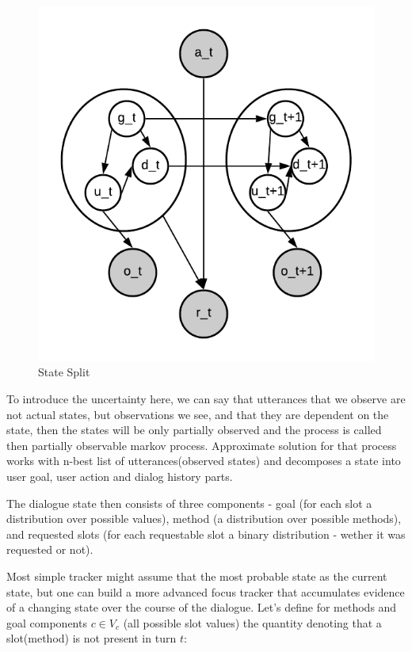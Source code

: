 \documentclass[12pt,titlepage,a4paper]{article}
\begin{document}
\begin{figure}[!htb]
      \includegraphics[width=\linewidth]{state-split.png}
      \caption{State Split}
    \endminipage\hfill
\end{figure}

To introduce the uncertainty here, we can say that utterances that we observe are not actual states, but observations we see, and that they are dependent on the state, then the states will be only partially observed and the process is called then partially observable markov process. Approximate solution for that process works with n-best list of utterances(observed states) and decomposes a state into user goal, user action and dialog history parts.

The dialogue state then consists of three components - goal (for each slot a distribution over possible values), method (a distribution over possible methods), and requested slots (for each requestable slot a binary distribution - wether it was requested or not).
\par
Most simple tracker might assume that the most probable state as the current state, but one can build a more advanced focus tracker that accumulates evidence of a changing state over the course of the dialogue. Let's define for methods and goal components $c \in V_c$ (all possible slot values) the quantity denoting that a slot(method) is not present in turn $t$:
\end{document}
